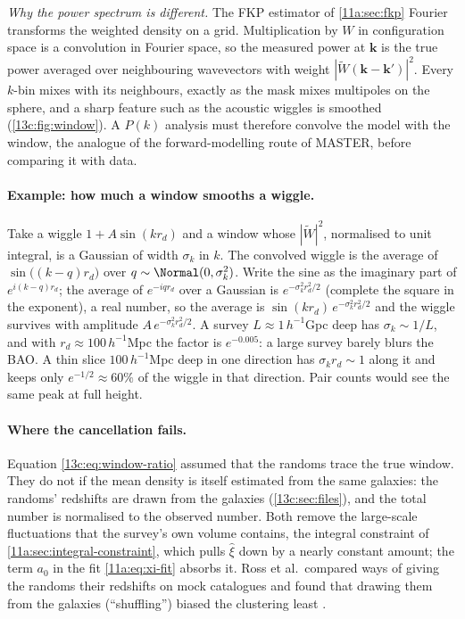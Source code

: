 \emph{Why the power spectrum is different.} The FKP estimator of \cref{11a:sec:fkp}
Fourier transforms the weighted density on a grid. Multiplication by $W$ in
configuration space is a convolution in Fourier space, so the measured power at $\bm k$
is the true power averaged over neighbouring wavevectors with weight $|\tilde
W(\bm k-\bm k')|^2$. Every $k$-bin mixes with its neighbours, exactly as the mask mixes
multipoles on the sphere, and a sharp feature such as the acoustic wiggles is
smoothed (\cref{13c:fig:window}). A $P(k)$ analysis must therefore convolve the model
with the window, the analogue of the forward-modelling route of MASTER, before
comparing it with data.

\paragraph{Example: how much a window smooths a wiggle.}
Take a wiggle $1+A\sin(kr_d)$ and a window whose $|\tilde W|^2$, normalised to unit
integral, is a Gaussian of width $\sigma_k$ in $k$. The convolved
wiggle is the average of $\sin\bigl((k-q)r_d\bigr)$ over $q\sim\Normal(0,\sigma_k^2)$.
Write the sine as the imaginary part of $e^{i(k-q)r_d}$; the average of $e^{-iqr_d}$
over a Gaussian is $e^{-\sigma_k^2r_d^2/2}$ (complete the square in the exponent), a
real number, so the average is $\sin(kr_d)\,e^{-\sigma_k^2r_d^2/2}$ and the wiggle
survives with amplitude $A\,e^{-\sigma_k^2r_d^2/2}$. A survey $L\approx1\,h^{-1}$Gpc deep has
$\sigma_k\sim1/L$, and with $r_d\approx100\,h^{-1}$Mpc the factor is
$e^{-0.005}$: a large survey barely blurs the BAO. A thin slice $100\,h^{-1}$Mpc deep
in one direction has $\sigma_kr_d\sim1$ along it and keeps only $e^{-1/2}\approx60\%$
of the wiggle in that direction. Pair counts would see the same peak at full height.

\paragraph{Where the cancellation fails.} Equation \eqref{13c:eq:window-ratio} assumed that
the randoms trace the true window. They do not if the mean density is itself estimated
from the same galaxies: the randoms' redshifts are drawn from the galaxies
(\cref{13c:sec:files}), and the total number is normalised to the observed number.
Both remove the large-scale fluctuations that the survey's own volume contains, the
integral constraint of \cref{11a:sec:integral-constraint}, which pulls $\hat\xi$ down
by a nearly constant amount; the term $a_0$ in the fit \eqref{11a:eq:xi-fit} absorbs
it. Ross et al.\ compared ways of giving the randoms their redshifts on mock catalogues
and found that drawing them from the galaxies (``shuffling'') biased the clustering
least .

